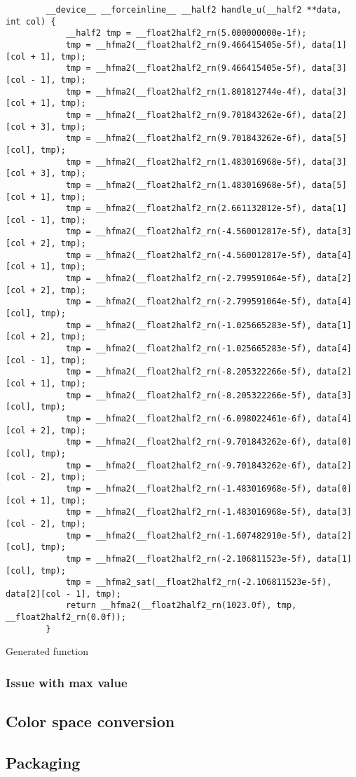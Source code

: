 \begin{listing}[H]
    \begin{verbatim}
        __device__ __forceinline__ __half2 handle_u(__half2 **data, int col) {
            __half2 tmp = __float2half2_rn(5.000000000e-1f);
            tmp = __hfma2(__float2half2_rn(9.466415405e-5f), data[1][col + 1], tmp);
            tmp = __hfma2(__float2half2_rn(9.466415405e-5f), data[3][col - 1], tmp);
            tmp = __hfma2(__float2half2_rn(1.801812744e-4f), data[3][col + 1], tmp);
            tmp = __hfma2(__float2half2_rn(9.701843262e-6f), data[2][col + 3], tmp);
            tmp = __hfma2(__float2half2_rn(9.701843262e-6f), data[5][col], tmp);
            tmp = __hfma2(__float2half2_rn(1.483016968e-5f), data[3][col + 3], tmp);
            tmp = __hfma2(__float2half2_rn(1.483016968e-5f), data[5][col + 1], tmp);
            tmp = __hfma2(__float2half2_rn(2.661132812e-5f), data[1][col - 1], tmp);
            tmp = __hfma2(__float2half2_rn(-4.560012817e-5f), data[3][col + 2], tmp);
            tmp = __hfma2(__float2half2_rn(-4.560012817e-5f), data[4][col + 1], tmp);
            tmp = __hfma2(__float2half2_rn(-2.799591064e-5f), data[2][col + 2], tmp);
            tmp = __hfma2(__float2half2_rn(-2.799591064e-5f), data[4][col], tmp);
            tmp = __hfma2(__float2half2_rn(-1.025665283e-5f), data[1][col + 2], tmp);
            tmp = __hfma2(__float2half2_rn(-1.025665283e-5f), data[4][col - 1], tmp);
            tmp = __hfma2(__float2half2_rn(-8.205322266e-5f), data[2][col + 1], tmp);
            tmp = __hfma2(__float2half2_rn(-8.205322266e-5f), data[3][col], tmp);
            tmp = __hfma2(__float2half2_rn(-6.098022461e-6f), data[4][col + 2], tmp);
            tmp = __hfma2(__float2half2_rn(-9.701843262e-6f), data[0][col], tmp);
            tmp = __hfma2(__float2half2_rn(-9.701843262e-6f), data[2][col - 2], tmp);
            tmp = __hfma2(__float2half2_rn(-1.483016968e-5f), data[0][col + 1], tmp);
            tmp = __hfma2(__float2half2_rn(-1.483016968e-5f), data[3][col - 2], tmp);
            tmp = __hfma2(__float2half2_rn(-1.607482910e-5f), data[2][col], tmp);
            tmp = __hfma2(__float2half2_rn(-2.106811523e-5f), data[1][col], tmp);
            tmp = __hfma2_sat(__float2half2_rn(-2.106811523e-5f), data[2][col - 1], tmp);
            return __hfma2(__float2half2_rn(1023.0f), tmp, __float2half2_rn(0.0f));
        }
      \end{verbatim}
    \caption{Generated function}
\end{listing}

\subsubsection{Issue with max value}
\subsection{Color space conversion}

\subsection{Packaging}